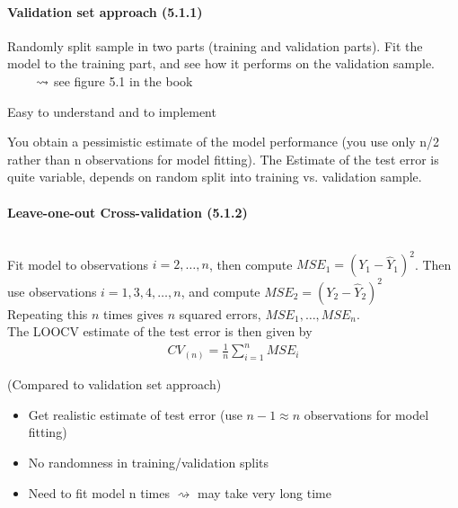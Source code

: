\documentclass[11pt,a4paper,numbers=endperiod]{scrartcl}
\newcommand{\id}{\hspace*{4mm}}
\newcommand{\tit}[1]{\begin{large} \underline{\text{#1}}\end{large}}
\begin{document}
{\paragraph{Validation set approach (5.1.1)}
$ $\\

Randomly split sample in two parts (training and validation parts). Fit the model to the training part, and see how it performs on the validation sample.\\
$\id \id \rightsquigarrow$ see figure 5.1 in the book\\
\tit{Pro:} Easy to understand and to implement\\
\tit{Contra:} You obtain a pessimistic estimate of the model performance (you use only n/2 rather than n observations for model fitting). The Estimate of the test error is quite variable, depends on random split into training vs. validation sample.\\

\paragraph{Leave-one-out Cross-validation (5.1.2)}
$ $\\

\tit{Idea:} Fit model to observations $i = 2, \ldots, n$, then compute $MSE_1 = (Y_1 - \hat{Y}_1)^2$. Then use observations $i = 1, 3, 4, \ldots,n$, and compute $MSE_2 = (Y_2 - \hat{Y}_2)^2$\\

Repeating this $n$ times gives $n$ squared errors, $MSE_1, \ldots, MSE_n$.\\
The LOOCV estimate of the test error is then given by \begin{align*}
	CV_{(n)} = \frac{1}{n} \sum\limits_{i = 1}^n MSE_i
\end{align*}
\tit{Pro:} (Compared to validation set approach) \begin{itemize}
	\item Get realistic estimate of test error (use $n-1 \approx n$ observations for model fitting)
	\item No randomness in training/validation splits
\end{itemize}

\tit{Con:} \begin{itemize}
	\item Need to fit model n times $\rightsquigarrow$ may take very long time 
\end{itemize}

}
\end{document}
